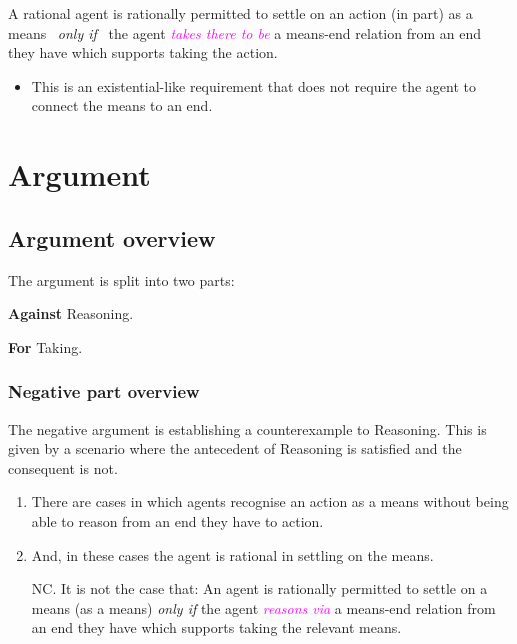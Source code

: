 \documentclass[10pt]{article}
\newenvironment{beamerblock}[1]{%
  \tcolorbox[standard,%
  no shadow,
  noparskip,
  colback=white,
  colframe=black,
  colbacktitle=white,
  coltitle=black,
  colupper=black,
  size=small,
  boxrule=.125mm,
  fonttitle=\bfseries,
  sharp corners=all,
  title=#1]}%
{\endtcolorbox}
\newcommand{\hozlinedash}[0]{%
  \noindent\hdashrule[0.5ex][c]{\textwidth}{.1pt}{2.5pt}
}
\newcommand{\schemaName}[1]{\textsf{#1}}
\begin{document}
\begin{beamerblock}{\schemaName{Taking}}
  A rational agent is rationally permitted to settle on an action (in part) as a means
  \newline
  \mbox{ }\hfill\emph{only if}\hfill\mbox{ }
  \newline
  the agent \textcolor{fuchsia}{\emph{takes there to be}} a means-end relation from an end they have which supports taking the action.
\end{beamerblock}

\begin{itemize}
\item This is an existential-like requirement that does not require the agent to connect the means to an end.
\end{itemize}

\hozlinedash

\newpage

\section{Argument}
\label{sec:argument}

\subsection{Argument overview}
\label{sec:argument-overview}

The argument is split into two parts:
\begin{enumerate*}[label=\roman*., ref=(\roman*)]
\item\label{position:Against} \textbf{Against} \schemaName{Reasoning}.
\item\label{position:For} \textbf{For} \schemaName{Taking}.
\end{enumerate*}

\subsubsection{Negative part overview}
\label{sec:negat-part-overv}

The negative argument is establishing a counterexample to \schemaName{Reasoning}.
This is given by a scenario where the antecedent of \schemaName{Reasoning} is satisfied and the consequent is not.

\begin{enumerate}[label=N\arabic*., ref=(N\arabic*)]

\item\label{scenarios:exist} There are cases in which agents recognise an action as a means without being able to reason from an end they have to action.

\item\label{scenarios:persmissible} And, in these cases the agent is rational in settling on the means.

\item[NC.]\label{scenario:no-reasoning} It is not the case that:
  An agent is rationally permitted to settle on a means (as a means)  \emph{only if} the agent \textcolor{fuchsia}{\emph{reasons via}} a means-end relation from an end they have which supports taking the relevant means.
\end{enumerate}
\end{document}
